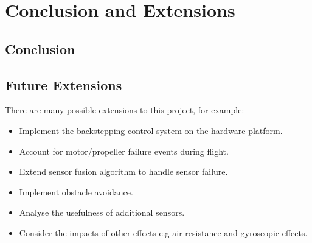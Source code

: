 
\chapter{Conclusion and Extensions}

\section{Conclusion}

\section{Future Extensions}
There are many possible extensions to this project, for example:

\begin{itemize}
\item Implement the backstepping control system on the hardware platform.\\
\item Account for motor/propeller failure events during flight.\\
\item Extend sensor fusion algorithm to handle sensor failure.\\
\item Implement obstacle avoidance.\\
\item Analyse the usefulness of additional sensors.\\
\item Consider the impacts of other effects e.g air resistance and gyroscopic effects.


\end{itemize}

\clearpage


